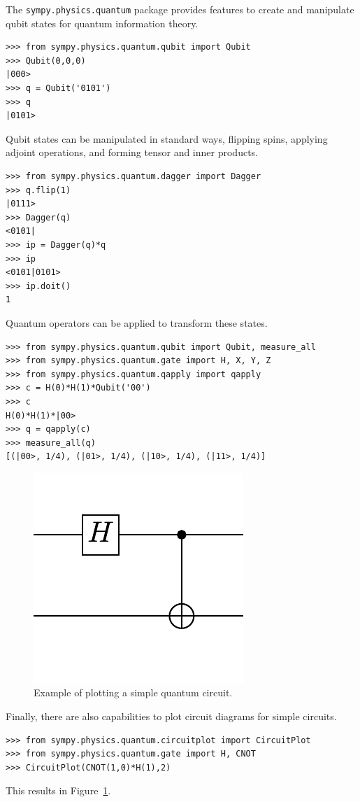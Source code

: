 The \verb|sympy.physics.quantum| package provides features to create and manipulate qubit states for quantum information theory. 
\begin{verbatim}
>>> from sympy.physics.quantum.qubit import Qubit
>>> Qubit(0,0,0)
|000>
>>> q = Qubit('0101')
>>> q
|0101>
\end{verbatim}
Qubit states can be manipulated in standard ways, flipping spins, applying adjoint operations, and forming tensor and inner products.
\begin{verbatim}
>>> from sympy.physics.quantum.dagger import Dagger
>>> q.flip(1)
|0111>
>>> Dagger(q)
<0101|
>>> ip = Dagger(q)*q
>>> ip
<0101|0101>
>>> ip.doit()
1
\end{verbatim}
Quantum operators can be applied to transform these states.
\begin{verbatim}
>>> from sympy.physics.quantum.qubit import Qubit, measure_all
>>> from sympy.physics.quantum.gate import H, X, Y, Z
>>> from sympy.physics.quantum.qapply import qapply
>>> c = H(0)*H(1)*Qubit('00')
>>> c
H(0)*H(1)*|00>
>>> q = qapply(c)
>>> measure_all(q)
[(|00>, 1/4), (|01>, 1/4), (|10>, 1/4), (|11>, 1/4)]
\end{verbatim}

\begin{figure}[htbp]
\begin{center}
\includegraphics[scale=0.75]{images/circuitplot-example-v2}
\caption{Example of plotting a simple quantum circuit.}
\label{fig-circuitplot-example}
\end{center}
\end{figure}

Finally, there are also capabilities to plot circuit diagrams for simple circuits.
\begin{verbatim}
>>> from sympy.physics.quantum.circuitplot import CircuitPlot
>>> from sympy.physics.quantum.gate import H, CNOT
>>> CircuitPlot(CNOT(1,0)*H(1),2)
\end{verbatim}
This results in Figure~\ref{fig-circuitplot-example}.
